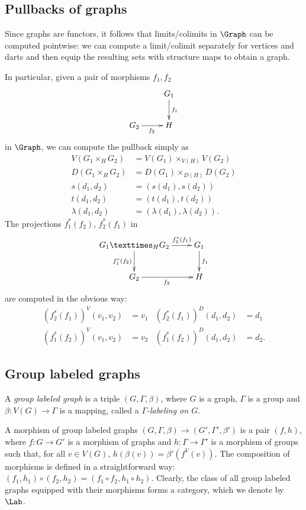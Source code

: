 \documentclass{amsart}
\theoremstyle{definition}
\newcommand{\pb}[3]{{#1}×_{#2}{#3}}
\begin{document}
\subsection{Pullbacks of graphs}
Since graphs are functors, it follows that limits/colimits in $\Graph$ can be computed pointwise: we can
compute a limit/colimit separately for vertices and darts and then equip the resulting
sets with structure maps to obtain a graph.

In particular, given a pair of morphisms $f_1,f_2$
$$
\xymatrix{
~
&
G_1
	\ar[d]^{f_1}
\\
G_2
	\ar[r]_{f_2}
&
H
}
$$
in $\Graph$, we can compute the pullback simply as
\begin{align*}
V(\pb{G_1}{H}{G_2})&=\pb{V(G_1)}{V(H)}{V(G_2)}\\
D(\pb{G_1}{H}{G_2})&=\pb{D(G_1)}{D(H)}{D(G_2)}\\
s(d_1,d_2)&=(s(d_1),s(d_2))\\
t(d_1,d_2)&=(t(d_1),t(d_2))\\
λ(d_1,d_2)&=(λ(d_1),λ(d_2)).
\end{align*}
The projections $f_1^*(f_2)$, $f_2^*(f_1)$ in 
$$
\xymatrix{
\pb{G_1}{H}{G_2}
	\ar[r]^-{f_2^*(f_1)}
	\ar[d]_{f_1^*(f_2)}
&
G_1
	\ar[d]^{f_1}
\\
G_2
	\ar[r]_{f_2}
&
H
}
$$
are computed in the obvious way:
\begin{align*}
(f_2^*(f_1))^V(v_1,v_2)&=v_1&(f_2^*(f_1))^D(d_1,d_2)&=d_1\\
(f_1^*(f_2))^V(v_1,v_2)&=v_2&(f_1^*(f_2))^D(d_1,d_2)&=d_2.
\end{align*}


\subsection{Group labeled graphs}

A {\em group labeled graph} 
is a triple $(G,Γ,β)$,
where $G$ is a graph, $Γ$ is a group and $β\colon V(G)\to Γ$ is a mapping, called a {\em $Γ$-labeling on
$G$}.

A morphism of group labeled graphs $(G,Γ,β)\to (G',Γ',β')$ is a
pair $(f,h)$, where $f\colon G\to G'$ is a morphism of graphs and
$h\colon Γ\to Γ'$ is a morphism of groups such that, for all $v\in V(G)$,
$h(β(v))=β'(f^V(v))$. The composition of morphisms is defined in a straightforward way:
$(f_1,h_1)\circ(f_2,h_2)=(f_1\circ f_2,h_1\circ h_2)$.
Clearly, the class of all group labeled graphs equipped with their morphisms
forms a category, which we denote by $\Lab$.
\end{document}
